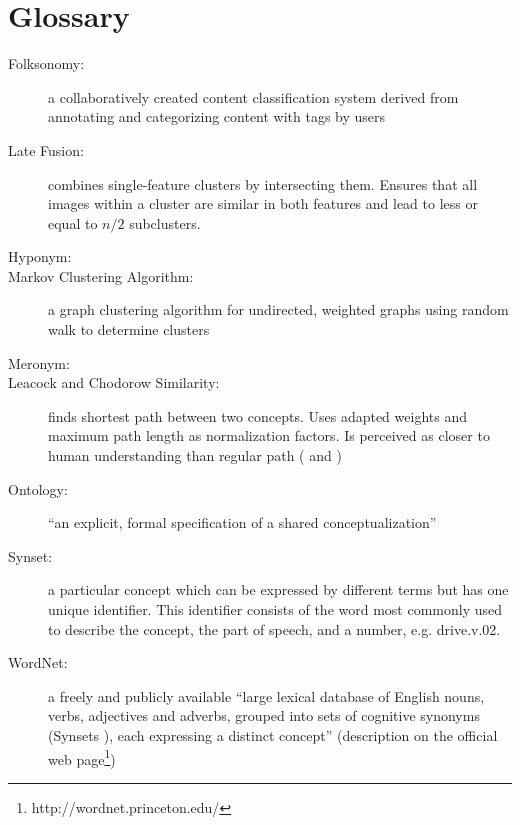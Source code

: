 \section{Glossary} %

\begin{description}
\item[Folksonomy:] a collaboratively created content classification system derived from annotating and categorizing content with tags by users

\item[Late Fusion:] combines single-feature clusters by intersecting them. Ensures that all images within a cluster are similar in both features and lead to less or equal to $n/2$ subclusters.

\item[Hyponym:]

\item[Markov Clustering Algorithm:] a graph clustering algorithm for undirected, weighted graphs using random walk to determine clusters

\item[Meronym:]

\item[Leacock and Chodorow Similarity:] finds shortest path between two concepts. Uses adapted weights and maximum path length as normalization factors. Is perceived as closer to human understanding than regular path (\cite{budanitsky01} and \cite{pedersen2004wordnet})

\item[Ontology:] ``an explicit, formal specification of a shared conceptualization'' \cite{gruber1993translation}

\item[Synset:] a particular concept which can be expressed by different terms but has one unique identifier. This identifier consists of the word most commonly used to describe the concept, the part of speech, and a number, e.g. drive.v.02.

\item[WordNet:] a freely and publicly available ``large lexical database of English nouns, verbs, adjectives and adverbs, grouped into sets of cognitive synonyms (Synsets ), each expressing a distinct concept'' (description on the official web page\footnote{http://wordnet.princeton.edu/})

\end{description}


